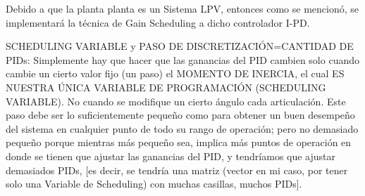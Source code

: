 \documentclass{article}
\begin{document}
\begin{sloppypar}
Debido a que la planta planta es un Sistema LPV, entonces como se mencionó, se implementará la técnica de Gain Scheduling a dicho controlador I-PD.

SCHEDULING VARIABLE y PASO DE DISCRETIZACIÓN=CANTIDAD DE PIDs:
Simplemente hay que hacer que las ganancias del PID cambien solo cuando cambie un cierto valor fijo (un paso) el MOMENTO DE INERCIA, el cual ES NUESTRA ÚNICA VARIABLE DE PROGRAMACIÓN (SCHEDULING VARIABLE). No cuando se modifique un cierto ángulo cada articulación. Este paso debe ser lo suficientemente pequeño como para obtener un buen desempeño del sistema en cualquier punto de todo su rango de operación; pero no demasiado pequeño porque mientras más pequeño sea, implica más puntos de operación en donde se tienen que ajustar las ganancias del PID, y tendríamos que ajustar demasiados PIDs, [es decir, se tendría una matriz (vector en mi caso, por tener solo una Variable de Scheduling) con muchas casillas, muchos PIDs].


\end{sloppypar}
\end{document}
